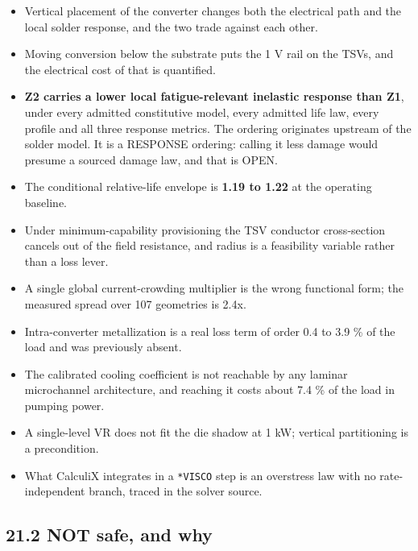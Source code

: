 \documentclass[10pt,]{article}
\providecommand{\tightlist}{%
  \setlength{\itemsep}{0pt}\setlength{\parskip}{0pt}}
\begin{document}
\begin{itemize}
\tightlist
\item
  Vertical placement of the converter changes both the electrical path
  and the local solder response, and the two trade against each other.
\item
  Moving conversion below the substrate puts the 1 V rail on the TSVs,
  and the electrical cost of that is quantified.
\item
  \textbf{Z2 carries a lower local fatigue-relevant inelastic response
  than Z1}, under every admitted constitutive model, every admitted life
  law, every profile and all three response metrics. The ordering
  originates upstream of the solder model. It is a RESPONSE ordering:
  calling it less damage would presume a sourced damage law, and that is
  OPEN.
\item
  The conditional relative-life envelope is \textbf{1.19 to 1.22} at the
  operating baseline.
\item
  Under minimum-capability provisioning the TSV conductor cross-section
  cancels out of the field resistance, and radius is a feasibility
  variable rather than a loss lever.
\item
  A single global current-crowding multiplier is the wrong functional
  form; the measured spread over 107 geometries is 2.4x.
\item
  Intra-converter metallization is a real loss term of order 0.4 to 3.9
  \% of the load and was previously absent.
\item
  The calibrated cooling coefficient is not reachable by any laminar
  microchannel architecture, and reaching it costs about 7.4 \% of the
  load in pumping power.
\item
  A single-level VR does not fit the die shadow at 1 kW; vertical
  partitioning is a precondition.
\item
  What CalculiX integrates in a \texttt{*VISCO} step is an overstress
  law with no rate-independent branch, traced in the solver source.
\end{itemize}

\hypertarget{not-safe-and-why}{%
\subsection{21.2 NOT safe, and why}\label{not-safe-and-why}}
\end{document}
